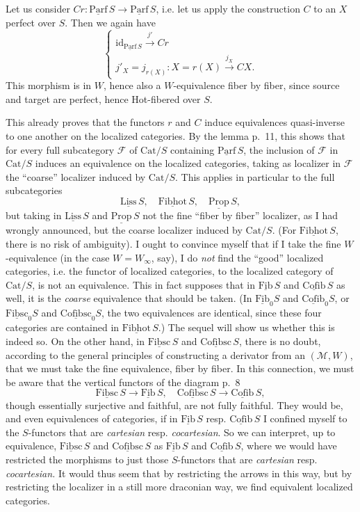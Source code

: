 \documentclass[11pt]{article}
\newcommand{\printedpage}[1]{\marginpar{\footnotesize p.~#1}}
\newcommand{\msp}[1]{\marginpar{\footnotesize [#1]}}
\newcommand{\und}[1]{\underline{\mathrm{#1}}}
\newcommand{\Cat}{\mathrm{Cat}}
\begin{document}
Let us consider $Cr : \und{Parf}\,S \longrightarrow \und{Parf}\,S$, i.e. let us apply the construction $C$ to an $X$ perfect over $S$. Then we again have
\[
\left\{
\begin{array}{l}
\mathrm{id}_{\und{Parf}\,S} \xrightarrow{j'} Cr \\[1ex]
j'_X = j_{r(X)} : X = r(X) \xrightarrow{j_X} CX.
\end{array}
\right.
\]
This morphism is in $W$, hence also a $W$-equivalence fiber by fiber, since source and target are perfect, hence Hot-fibered over $S$.

\msp{page 25}
This already proves that the functors $r$ and $C$ induce equivalences quasi-inverse to one another on the localized categories. By the lemma p.~11, this shows that for every full subcategory $\mathcal{F}$ of $\Cat/S$ containing $\und{Parf}\,S$, the inclusion of $\mathcal{F}$ in $\Cat/S$ induces an
\printedpage{16}
equivalence on the localized categories, taking as localizer in $\mathcal{F}$ the ``coarse'' localizer induced by $\Cat/S$. This applies in particular to the full subcategories
\[ \und{Liss}\,S, \quad \und{Fibhot}\,S, \quad \und{Prop}\,S, \]
but taking in $\und{Liss}\,S$ and $\und{Prop}\,S$ not the fine ``fiber by fiber'' localizer, as I had wrongly announced, but the coarse localizer induced by $\Cat/S$. (For $\und{Fibhot}\,S$, there is no risk of ambiguity). I ought to convince myself that if I take the fine $W$-equivalence (in the case $W = W_\infty$, say), I do \textit{not} find the ``good'' localized categories, i.e. the functor of localized categories, to the localized category of $\Cat/S$, is not an equivalence. This in fact supposes that in $\und{Fib}\,S$ and $\und{Cofib}\,S$ as well, it is the \textit{coarse} equivalence
\msp{page 26}
that should be taken. (In $\und{Fib}_0S$ and $\und{Cofib}_0S$, or $\und{Fibsc}_0S$ and $\und{Cofibsc}_0S$, the two equivalences are identical, since these four categories are contained in $\und{Fibhot}\,S$.) The sequel will show us whether this is indeed so. On the other hand, in $\und{Fibsc}\,S$ and $\und{Cofibsc}\,S$, there is no doubt, according to the general principles of constructing a derivator from an $(\mathcal{M}, W)$, that we must take the fine equivalence, fiber by fiber. In this connection, we must be aware that the vertical functors of the diagram p.~8
\[ \und{Fibsc}\,S \longrightarrow \und{Fib}\,S, \quad \und{Cofibsc}\,S \longrightarrow \und{Cofib}\,S, \]
though essentially surjective and faithful, are not fully faithful. They would be, and even equivalences of categories, if in $\und{Fib}\,S$ resp. $\und{Cofib}\,S$ I confined myself to the $S$-functors that are \textit{cartesian} resp. \textit{cocartesian}. So we can interpret, up to equivalence, $\und{Fibsc}\,S$ and $\und{Cofibsc}\,S$ as $\und{Fib}\,S$ and $\und{Cofib}\,S$, where we would have restricted the morphisms to just those $S$-functors that are \textit{cartesian} resp. \textit{cocartesian.} It would thus seem that by restricting the arrows in this way, but by restricting the localizer in a still more draconian way, we find equivalent localized categories. %
\end{document}
